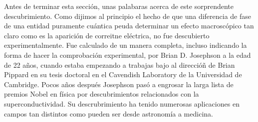Antes de terminar esta sección, unas palabaras acerca de este sorprendente descubrimiento. Como dijimos al principio el hecho de que una diferencia de fase de una entidad puramente cuántica peuda determinar un efecto macroscópico tan claro como es la aparición de correitne eléctrica, no fue descubierto experimentalmente. Fue calculado de un manera completa, incluso indicando la forma de hacer la comprobación experimental, por Brian D. Josephson a la edad de 22 años, cuando estaba empezando a trabajas bajo al direccióñ de Brian Pippard en su tesis doctoral en el Cavendish Laboratory de la Universidad de Cambridge. Pocos años después Josephson pasó a engrosar la larga lista de premios Nobel en física por descubrimientos relacionados con la superconductividad. Su descrubrimiento ha tenido numerosas aplicaciones en campos tan distintos como pueden ser desde astronomía a medicina.
